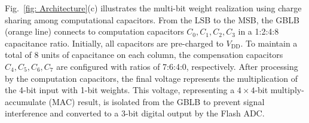 Fig.~\ref{fig: Architecture}(c) illustrates the multi-bit weight realization using charge sharing among computational capacitors. 
From the LSB to the MSB, the GBLB (orange line) connects to computation capacitors $C_0, C_1, C_2, C_3$ in a 1:2:4:8 capacitance ratio. 
Initially, all capacitors are pre-charged to ${V}_{\text{DD}}$.
To maintain a total of 8 units of capacitance on each column, the compensation capacitors $C_4, C_5, C_6, C_7$ are configured with ratios of 7:6:4:0, respectively.
After processing by the computation capacitors, the final voltage represents the multiplication of the 4-bit input with 1-bit weights. 
This voltage, representing a $4\times4$-bit multiply-accumulate (MAC) result, is isolated from the GBLB to prevent signal interference and converted to a 3-bit digital output by the Flash ADC.





